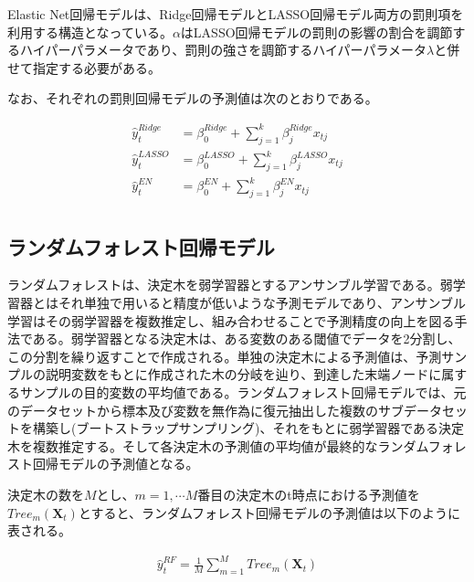 \documentclass[a4paper, 12pt]{jsarticle}
\begin{document}
Elastic Net回帰モデルは、Ridge回帰モデルとLASSO回帰モデル両方の罰則項を利用する構造となっている。$\alpha$はLASSO回帰モデルの罰則の影響の割合を調節するハイパーパラメータであり、罰則の強さを調節するハイパーパラメータ$\lambda$と併せて指定する必要がある。

なお、それぞれの罰則回帰モデルの予測値は次のとおりである。

\begin{equation}
  \begin{split}
    \hat{y}_t^{Ridge} &= \beta_0^{Ridge} + \sum_{j=1}^{k} \beta_{j}^{Ridge} x_{tj} \\
    \hat{y}_t^{LASSO} &= \beta_0^{LASSO} + \sum_{j=1}^{k} \beta_{j}^{LASSO} x_{tj} \\
    \hat{y}_t^{EN} &= \beta_0^{EN} + \sum_{j=1}^{k} \beta_{j}^{EN} x_{tj} \\
  \end{split}
\end{equation}

\subsection{ランダムフォレスト回帰モデル}

ランダムフォレスト\citep{breiman2001random}は、決定木を弱学習器とするアンサンブル学習である。弱学習器とはそれ単独で用いると精度が低いような予測モデルであり、アンサンブル学習はその弱学習器を複数推定し、組み合わせることで予測精度の向上を図る手法である。弱学習器となる決定木は、ある変数のある閾値でデータを2分割し、この分割を繰り返すことで作成される。単独の決定木による予測値は、予測サンプルの説明変数をもとに作成された木の分岐を辿り、到達した末端ノードに属するサンプルの目的変数の平均値である。ランダムフォレスト回帰モデルでは、元のデータセットから標本及び変数を無作為に復元抽出した複数のサブデータセットを構築し(ブートストラップサンプリング)、それをもとに弱学習器である決定木を複数推定する。そして各決定木の予測値の平均値が最終的なランダムフォレスト回帰モデルの予測値となる。


決定木の数を$M$とし、$m=1, \cdots M$番目の決定木のt時点における予測値を$\textit{Tree}_m(\bm{X}_t)$とすると、ランダムフォレスト回帰モデルの予測値は以下のように表される。

\begin{equation}
  \begin{split}
    \hat{y}_t^{RF} = \frac{1}{M} \sum_{m=1}^{M} \textit{Tree}_m(\bm{X}_t)
  \end{split}
\end{equation}
\end{document}
